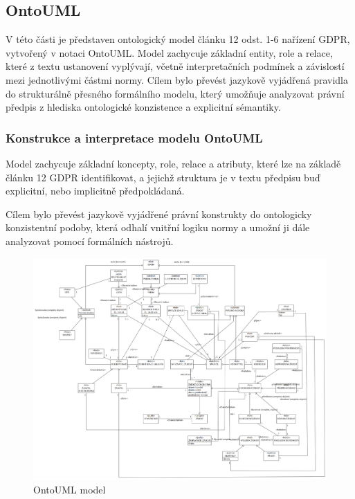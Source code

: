 
\subsection{OntoUML}
\label{sec:ontouml}
V této části je představen ontologický model článku 12 odst. 1-6 nařízení GDPR, vytvořený v notaci OntoUML. Model zachycuje základní entity, role a relace, které z textu ustanovení vyplývají, včetně interpretačních podmínek a závislostí mezi jednotlivými částmi normy. Cílem bylo převést jazykově vyjádřená pravidla do strukturálně přesného formálního modelu, který umožňuje analyzovat právní předpis z hlediska ontologické konzistence a explicitní sémantiky.

\subsubsection{Konstrukce a interpretace modelu OntoUML}
\label{sec:form-model-konstrukce-interpretace}
Model zachycuje základní koncepty, role, relace a atributy, které lze na základě článku 12 GDPR identifikovat, a jejichž struktura je v textu předpisu buď explicitní, nebo implicitně předpokládaná. 

Cílem bylo převést jazykově vyjádřené právní konstrukty do ontologicky konzistentní podoby, která odhalí vnitřní logiku normy a umožní ji dále analyzovat pomocí formálních nástrojů.

\begin{figure}[H]
  \centering
  \includegraphics[width=\textwidth]{images/OntoUML.png}
  \caption{OntoUML model}
  \label{fig:ontouml}
\end{figure}

